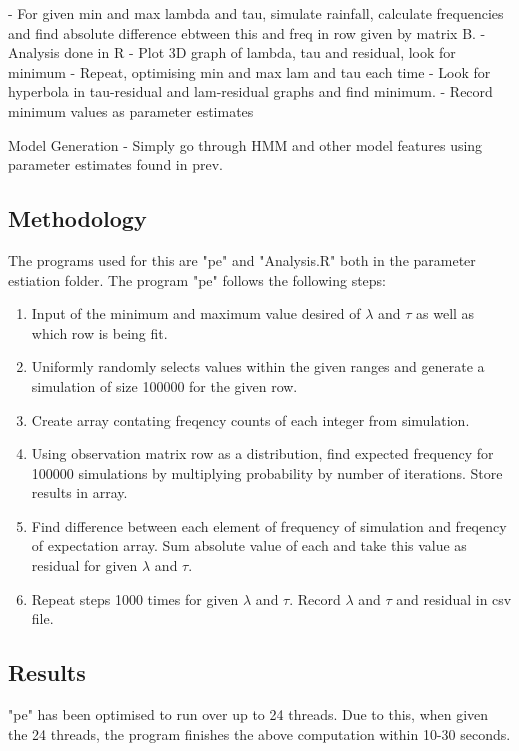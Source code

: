 - For given min and max lambda and tau, simulate rainfall, calculate frequencies and find absolute difference ebtween this and freq in row given by matrix B.
- Analysis done in R
- Plot 3D graph of lambda, tau and residual, look for minimum
- Repeat, optimising min and max lam and tau each time 
- Look for hyperbola in tau-residual and lam-residual graphs and find minimum. 
- Record minimum values as parameter estimates

Model Generation
- Simply go through HMM and other model features using parameter estimates found in prev.


\subsection{Methodology}

The programs used for this are "pe" and "Analysis.R" both in the parameter estiation folder. The program "pe" follows the following steps:
\begin{enumerate}
    \item Input of the minimum and maximum value desired of $\lambda$ and $\tau$ as well as which row is being fit.
    \item Uniformly randomly selects values within the given ranges and generate a simulation of size 100000 for the given row.
    \item Create array contating freqency counts of each integer from simulation.
    \item Using observation matrix row as a distribution, find expected frequency for 100000 simulations by multiplying probability by number of iterations. Store results in array.
    \item Find difference between each element of frequency of simulation and freqency of expectation array. Sum absolute value of each and take this value as residual for given $\lambda$ and $\tau$. 
    \item Repeat steps 1000 times for given $\lambda$ and $\tau$. Record $\lambda$ and $\tau$ and residual in csv file. 
\end{enumerate}



\subsection{Results}
"pe" has been optimised to run over up to 24 threads. Due to this, when given the 24 threads,  the program finishes the above computation within 10-30 seconds.


